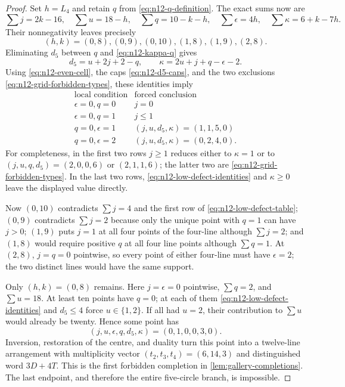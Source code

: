 \begin{proof}
Set $h=L_4$ and retain $q$ from \eqref{eq:n12-q-definition}.  The exact
sums now are
\begin{equation}\label{eq:n12-C50-six-sums}
\sum j=2k-16,\quad \sum u=18-h,\quad
\sum q=10-k-h,\quad \sum\epsilon=4h,\quad
\sum\kappa=6+k-7h.
\end{equation}
Their nonnegativity leaves precisely
\[
 (h,k)=(0,8),(0,9),(0,10),(1,8),(1,9),(2,8).
\]
Eliminating $d_5$ between $q$ and \eqref{eq:n12-kappa-q} gives
\begin{equation}\label{eq:n12-low-defect-identities}
d_5=u+2j+2-q,\qquad
\kappa=2u+j+q-\epsilon-2.
\end{equation}
Using \eqref{eq:n12-even-cell}, the caps
\eqref{eq:n12-d5-caps}, and the two exclusions
\eqref{eq:n12-grid-forbidden-types}, these identities imply
\begin{equation}\label{eq:n12-low-defect-table}
\begin{array}{c|c}
\text{local condition}&\text{forced conclusion}\\ \hline
\epsilon=0,q=0&j=0\\
\epsilon=0,q=1&j\le1\\
q=0,\epsilon=1&(j,u,d_5,\kappa)=(1,1,5,0)\\
q=0,\epsilon=2&(j,u,d_5,\kappa)=(0,2,4,0).
\end{array}
\end{equation}
For completeness, in the first two rows $j\ge1$ reduces either to
$\kappa=1$ or to $(j,u,q,d_5)=(2,0,0,6)$ or $(2,1,1,6)$; the latter two
are \eqref{eq:n12-grid-forbidden-types}.  In the last two rows,
\eqref{eq:n12-low-defect-identities} and $\kappa\ge0$ leave the displayed
value directly.

Now $(0,10)$ contradicts $\sum j=4$ and the first row of
\eqref{eq:n12-low-defect-table}; $(0,9)$ contradicts $\sum j=2$ because
only the unique point with $q=1$ can have $j>0$; $(1,9)$ puts $j=1$ at all
four points of the four-line although $\sum j=2$; and $(1,8)$ would require
positive $q$ at all four line points although $\sum q=1$.  At $(2,8)$,
$j=q=0$ pointwise, so every point of either four-line must have
$\epsilon=2$; the two distinct lines would have the same support.

Only $(h,k)=(0,8)$ remains.  Here $j=\epsilon=0$ pointwise,
$\sum q=2$, and $\sum u=18$.  At least ten points have $q=0$; at each of
them \eqref{eq:n12-low-defect-identities} and $d_5\le4$ force
$u\in\{1,2\}$.  If all had $u=2$, their contribution to $\sum u$ would
already be twenty.  Hence some point has
\[
 (j,u,\epsilon,q,d_5,\kappa)=(0,1,0,0,3,0).
\]
Inversion, restoration of the centre, and duality turn this point into a
twelve-line arrangement with multiplicity vector
$(t_2,t_3,t_4)=(6,14,3)$ and distinguished word $3D+4T$.  This is the first
forbidden completion in \cref{lem:gallery-completions}.  The last endpoint,
and therefore the entire five-circle branch, is impossible.
\end{proof}

